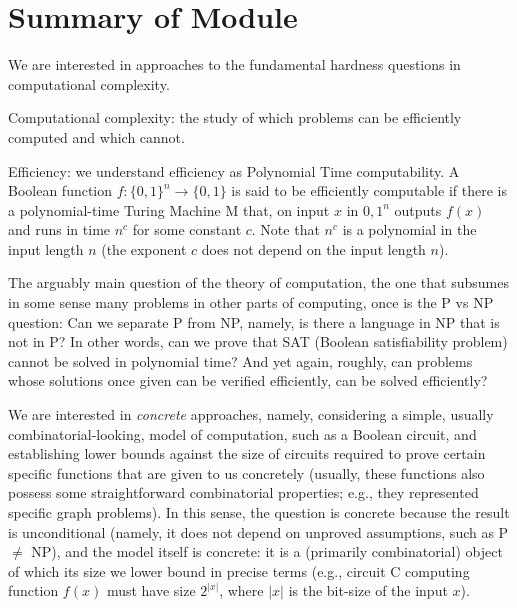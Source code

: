 %
%  
%
%






\section{Summary of Module}
\label{sec:1}

 We are interested in approaches to the fundamental hardness questions in computational complexity.

Computational complexity: the study of which problems can be efficiently computed and which cannot.

Efficiency: we understand efficiency as Polynomial Time computability. A Boolean function $f:\{0,1\}^n\to\{0,1\}$ is said to be efficiently computable if there is a polynomial-time Turing Machine M that, on input $x$ in ${0,1}^n$ outputs $f(x)$ and runs in time $n^c$ for some constant $c$. Note that $n^c$ is a polynomial in the input length $n$ (the exponent $c$ does not depend on the input length $n$). 

The arguably main question of the theory of computation, the one that subsumes in some sense many problems in other parts of computing, once is the P vs NP question: Can we separate P from NP, namely, is there a language in NP that is not in P? In other words, can we prove that SAT (Boolean satisfiability problem) cannot be solved in polynomial time? And yet again, roughly, can problems whose solutions once given can be verified efficiently, can be solved efficiently? 

We are interested in \emph{concrete} approaches, namely, considering a simple, usually combinatorial-looking, model of computation, such as a Boolean circuit, and establishing lower bounds against the size of circuits required to prove certain specific functions that are given to us concretely (usually, these functions also possess some straightforward combinatorial properties; e.g., they represented specific graph problems). In this sense, the question is concrete because the result is unconditional (namely, it does not depend on unproved assumptions, such as P $\neq$ NP), and the model itself is concrete: it is a (primarily combinatorial) object of which its size we lower bound in precise terms (e.g., circuit C computing function $f(x)$ must have size $2^{|x|}$, where $|x|$ is the bit-size of the input $x$).
\medskip 

